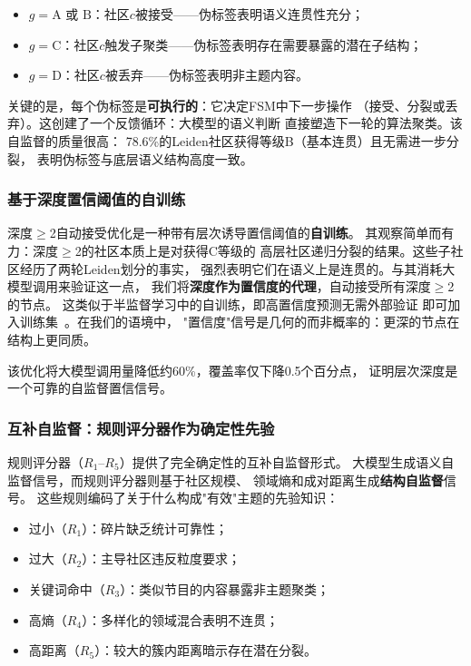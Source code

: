 \documentclass[10pt,twocolumn,twoside]{ctexart}
\begin{document}
\begin{itemize}[nosep]
    \item $g = \text{A 或 B}$：社区$c$被接受——伪标签表明语义连贯性充分；
    \item $g = \text{C}$：社区$c$触发子聚类——伪标签表明存在需要暴露的潜在子结构；
    \item $g = \text{D}$：社区$c$被丢弃——伪标签表明非主题内容。
\end{itemize}

关键的是，每个伪标签是\textbf{可执行的}：它决定FSM中下一步操作
（接受、分裂或丢弃）。这创建了一个反馈循环：大模型的语义判断
直接塑造下一轮的算法聚类。该自监督的质量很高：
78.6\%的Leiden社区获得等级B（基本连贯）且无需进一步分裂，
表明伪标签与底层语义结构高度一致。

\subsubsection{基于深度置信阈值的自训练}

深度$\geq$2自动接受优化是一种带有层次诱导置信阈值的\textbf{自训练}。
其观察简单而有力：深度$\geq$2的社区本质上是对获得C等级的
高层社区递归分裂的结果。这些子社区经历了两轮Leiden划分的事实，
强烈表明它们在语义上是连贯的。与其消耗大模型调用来验证这一点，
我们将\textbf{深度作为置信度的代理}，自动接受所有深度$\geq$2的节点。
这类似于半监督学习中的自训练，即高置信度预测无需外部验证
即可加入训练集~\citep{lee2013pseudo}。在我们的语境中，
"置信度"信号是几何的而非概率的：更深的节点在结构上更同质。

该优化将大模型调用量降低约60\%，覆盖率仅下降0.5个百分点，
证明层次深度是一个可靠的自监督置信信号。

\subsubsection{互补自监督：规则评分器作为确定性先验}

规则评分器（$R_1$--$R_5$）提供了完全确定性的互补自监督形式。
大模型生成语义自监督信号，而规则评分器则基于社区规模、
领域熵和成对距离生成\textbf{结构自监督}信号。
这些规则编码了关于什么构成"有效"主题的先验知识：

\begin{itemize}[nosep]
    \item 过小（$R_1$）：碎片缺乏统计可靠性；
    \item 过大（$R_2$）：主导社区违反粒度要求；
    \item 关键词命中（$R_3$）：类似节目的内容暴露非主题聚类；
    \item 高熵（$R_4$）：多样化的领域混合表明不连贯；
    \item 高距离（$R_5$）：较大的簇内距离暗示存在潜在分裂。
\end{itemize}
\end{document}

